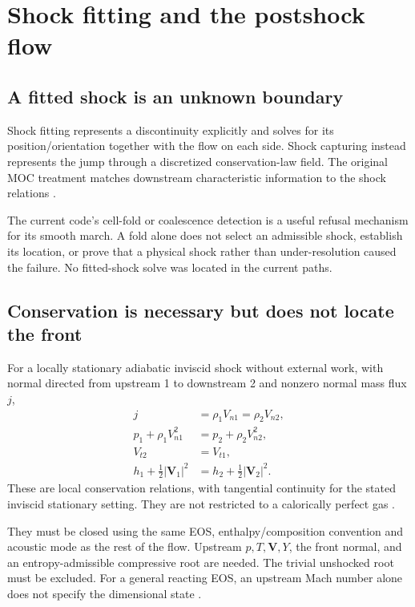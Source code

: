 \section{Shock fitting and the postshock flow}
\label{sec:shock}
\subsection{A fitted shock is an unknown boundary}
Shock fitting represents a discontinuity explicitly and solves for its
position/orientation together with the flow on each side. Shock capturing
instead represents the jump through a discretized conservation-law field.
The original MOC treatment matches downstream characteristic information
to the shock relations \cite[\S11.5.3, PDF p.~411;
\S11.15, PDF p.~438]{anderson}.

The current code's cell-fold or coalescence detection is a useful refusal
mechanism for its smooth march. A fold alone does not select an admissible
shock, establish its location, or prove that a physical shock rather than
under-resolution caused the failure. No fitted-shock solve was located in
the current  paths.

\subsection{Conservation is necessary but does not locate the front}
For a locally stationary adiabatic inviscid shock without external work, with normal directed from
upstream 1 to downstream 2 and nonzero normal mass flux \(j\),
\begin{align}
j&=\rho_1V_{n1}=\rho_2V_{n2},\\
p_1+\rho_1V_{n1}^2&=p_2+\rho_2V_{n2}^2,\\
V_{t2}&=V_{t1},\\
h_1+\tfrac12|\mathbf V_1|^2&=
h_2+\tfrac12|\mathbf V_2|^2 .
\label{eq:RH}
\end{align}
These are local conservation relations, with tangential continuity for
the stated inviscid stationary setting. They are not restricted to a
calorically perfect gas
\cite[\S3.6, PDF p.~104, Eqs.~3.38--3.40;
\S4.3, PDF pp.~150--151, Eqs.~4.3--4.6]{anderson}.

They must be closed using the same EOS, enthalpy/composition convention
and acoustic mode as the rest of the flow. Upstream \(p,T,\mathbf V,Y\),
the front normal, and an entropy-admissible compressive root are needed.
The trivial unshocked root must be excluded. For a general reacting EOS,
an upstream Mach number alone does not specify the dimensional state
\cite[\S17.2, PDF pp.~665--668]{anderson}.

